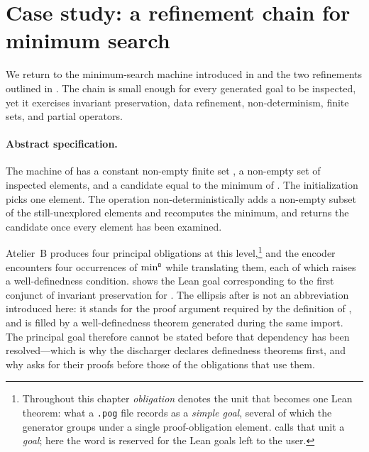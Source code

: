\section{Case study: a refinement chain for minimum search}
\label{sec:barrel-example}
\label{subsec:barrel-minsearch}

We return to the minimum-search machine introduced in  and
the two refinements outlined in .
The chain is small enough for every generated goal to be inspected, yet it exercises invariant
preservation, data refinement, non-determinism, finite sets, and partial
operators.

\paragraph*{Abstract specification.}
The machine of  has a constant non-empty finite set
, a non-empty set  of inspected elements, and a candidate 
equal to the minimum of .
The initialization picks one element.
The operation  non-deterministically adds a non-empty subset of the
still-unexplored elements and recomputes the minimum, and  returns the
candidate once every element has been examined.

Atelier~B produces four principal obligations at this level,\footnote{Throughout this
chapter \emph{obligation} denotes the unit that becomes one Lean theorem: what a
\texttt{.pog} file records as a \emph{simple goal}, several of which the generator groups
under a single proof-obligation element.  calls that unit a
\emph{goal}; here the word is reserved for the Lean goals left to the user.} and the
encoder encounters four occurrences of \(\mathop{{\min}^{\scriptscriptstyle{\mathsf{B}}}}\) while translating them, each of which
raises a well-definedness condition.
 shows the Lean goal corresponding to the first conjunct of
invariant preservation for .
The ellipsis after  is not an abbreviation introduced here: it stands for
the proof argument required by the definition of
, and is filled by a well-definedness theorem
generated during the same import.
The principal goal therefore cannot be stated before that dependency has been
resolved---which is why the discharger declares definedness theorems first, and why
 asks for their proofs before those of the obligations that
use them.

